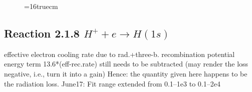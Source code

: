 \documentclass[12pt,dvipdfmx]{article}
\begin{document}
\begin{small}
\begin{verbatim}
\end{verbatim}\end{small}
\begin{figure} \label{2.1.5io}
\epsfxsize=16truecm
\end{figure}
\newpage

\subsection{
  Reaction 2.1.8  $H^+ + e  \rightarrow H(1s) $
}

   effective electron cooling rate due to rad.+three-b. recombination
   potential energy term 13.6*(eff-rec.rate) still needs to be
   subtracted (may render the loss negative, i.e., turn it into a gain)
   Hence: the quantity given here happens to be the radiation loss.
   June17: Fit range extended from 0.1--1e3 to 0.1--2e4
\end{document}
